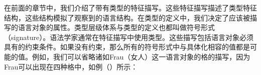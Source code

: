 在前面的章节中，我们介绍了带有类型的特征描写。这些特征描写描述了类型特征结构，这些结构模拟了观察到的语言结构。在类型的定义中，我们决定了应该被描写的语言对象的属性。类型层级体系与类型的定义也都叫做符号形式（signature）。语法学家通常在特征描写中使用类型。这些描写包括语言对象必须具有的约束条件。如果没有约束，那么所有的符号形式中与具体化相容的值都是可能的值。例如，我们可以省略诸如Frau（女人）这一语言对象的格的描写，因为Frau可以出现在四种格中，如例（）所示：

